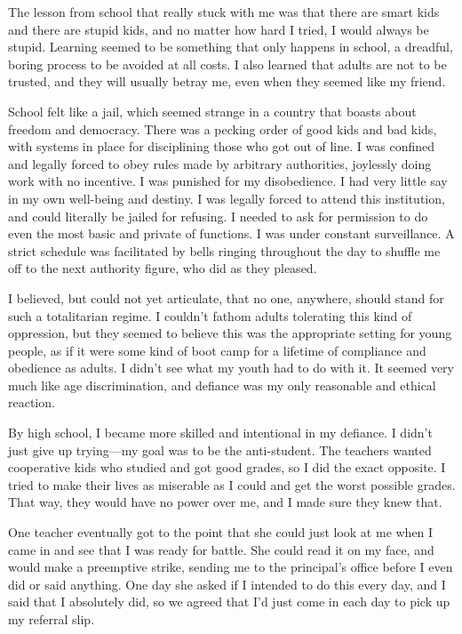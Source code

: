 The lesson from school that really stuck with me was that there are smart kids and there are stupid kids, and no matter how hard I tried, I would always be stupid. Learning seemed to be something that only happens in school, a dreadful, boring process to be avoided at all costs. I also learned that adults are not to be trusted, and they will usually betray me, even when they seemed like my friend.

School felt like a jail, which seemed strange in a country that boasts about freedom and democracy. There was a pecking order of good kids and bad kids, with systems in place for disciplining those who got out of line. I was confined and legally forced to obey rules made by arbitrary authorities, joylessly doing work with no incentive. I was punished for my disobedience. I had very little say in my own well-being and destiny. I was legally forced to attend this institution, and could literally be jailed for refusing. I needed to ask for permission to do even the most basic and private of functions. I was under constant surveillance. A strict schedule was facilitated by bells ringing throughout the day to shuffle me off to the next authority figure, who did as they pleased.

I believed, but could not yet articulate, that no one, anywhere, should stand for such a totalitarian regime. I couldn't fathom adults tolerating this kind of oppression, but they seemed to believe this was the appropriate setting for young people, as if it were some kind of boot camp for a lifetime of compliance and obedience as adults. I didn't see what my youth had to do with it. It seemed very much like age discrimination, and defiance was my only reasonable and ethical reaction.

By high school, I became more skilled and intentional in my defiance. I didn't just give up trying---my goal was to be the anti-student. The teachers wanted cooperative kids who studied and got good grades, so I did the exact opposite. I tried to make their lives as miserable as I could and get the worst possible grades. That way, they would have no power over me, and I made sure they knew that.

One teacher eventually got to the point that she could just look at me when I came in and see that I was ready for battle. She could read it on my face, and would make a preemptive strike, sending me to the principal's office before I even did or said anything. One day she asked if I intended to do this every day, and I said that I absolutely did, so we agreed that I'd just come in each day to pick up my referral slip.

